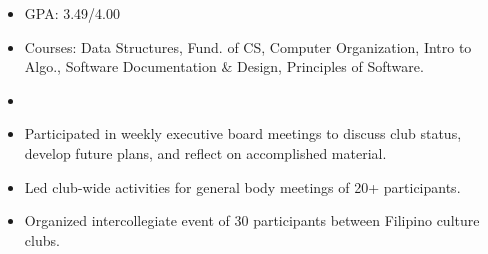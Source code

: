 






\begin{itemize}
\item GPA: 3.49/4.00
\item Courses: Data Structures, Fund. of CS, Computer Organization, Intro to Algo., Software Documentation \& Design, Principles of Software.
\end{itemize}

\begin{itemize}
\item
\end{itemize}

\begin{itemize}
\item Participated in weekly executive board meetings to discuss club status, develop future plans, and reflect on accomplished material.
\item Led club-wide activities for general body meetings of 20+ participants.
\item Organized intercollegiate event of 30 participants between Filipino culture clubs.
\end{itemize}



